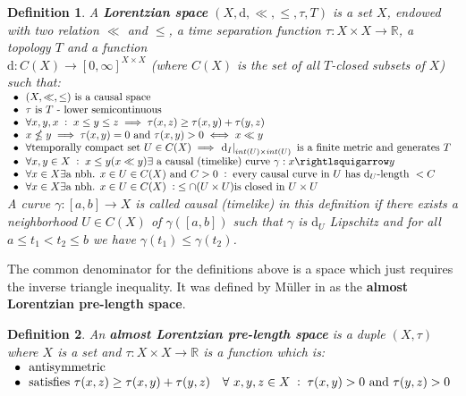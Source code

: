 \documentclass[11pt, a4paper]{article} %
\newcommand{\R}{\mathbb{R}} %
\newcommand{\dd}{\text{d}} %
\newtheorem{definition}{Definition}[section]
\theoremstyle{plain} %
\newcommand{\pp}{\; \vcentcolon \;}
\begin{document}
\begin{definition}
\label{defLorSp}
    A \textbf{Lorentzian space} $(X,\dd,\ll,\leq,\tau,T)$ is a set $X$, endowed with two relation $\ll$ and $\leq$, a time separation function $\tau:X\times X\to \R$, a topology $T$ and a function\\ $\dd:C(X)\to [0,\infty]^{X\times X}$ (where $C(X)$ is the set of all $T$-closed subsets of $X$) such that:\\
    $\begin{array}{l}
         \bullet\ \ (X,\ll,\leq) \text{ is a causal space}\\
         \bullet\ \ \tau \text{ is $T$ - lower semicontinuous}\\
         \bullet\ \ \forall x,y,x\pp x\leq y\leq z \implies \tau(x,z) \geq \tau(x,y) + \tau(y,z)\\
         \bullet\ \ x\nleq y \implies \tau(x,y)=0 \text{ and } \tau(x,y)>0 \iff x\ll y\\
         \bullet\ \ \forall \text{temporally compact set }U\in C(X) \implies \left.\dd_I\right|_{int(U)\times int(U)} \text{ is a finite metric and generates }T\\
         \bullet\ \ \forall x,y\in X \pp x\leq y (x\ll y) \exists \text{ a causal (timelike) curve } \gamma:x \rightlsquigarrow y\\
         \bullet\ \ \forall x\in X\exists \text{a nbh. }x\in U\in C(X) \text{ and } C>0 \pp \text{every causal curve in $U$ has }\dd_U \text{-length }<C\\
         \bullet \ \ \forall x\in X \exists \text{a nbh. } x\in U\in C(X) \pp \leq \cap (U\times U) \text{is closed in } U\times U
    \end{array}$\\
    A curve $\gamma:[a,b]\to X$ is called causal (timelike) in this definition if there exists a neighborhood $U\in C(X)$ of $\gamma([a,b])$ such that $\gamma$ is $\dd_U$ Lipschitz and for all $a\leq t_1<t_2\leq b$ we have $\gamma(t_1)\leq\gamma(t_2)$.
\end{definition}
The common denominator for the definitions above is a space which just requires the inverse triangle inequality. It was defined by Müller in \cite{muller2022gromovMetricAndDimension} as the \textbf{almost Lorentzian pre-length space}.
\begin{definition}
An \textbf{almost Lorentzian pre-length space} is a duple $(X,\tau)$ where $X$ is a set and $\tau: X\times X\to \R$ is a function which is:\\
$\begin{array}{l}
\bullet\ \ \text{antisymmetric}\\
\bullet\ \ \text{satisfies }\tau(x,z) \geq \tau(x,y) + \tau(y,z) \ \ \ \forall\ x,y,z \in X\pp \tau(x,y)>0 \text{ and }\tau(y,z)>0\\
\end{array}$
\end{definition}
\end{document}
